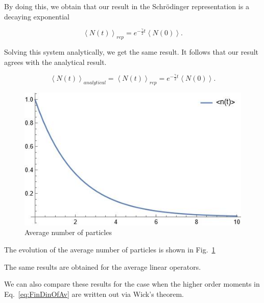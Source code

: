 \documentclass[12pt]{article}
\theoremstyle{definition}
\newcommand\bra{\left<}
\newcommand\ket{\right>}
\newcommand{\braket}[1]{\bra#1\ket}
\def\ga {\gamma}
\begin{document}
	By doing this, we obtain that our result in the Schrödinger representation is a decaying exponential
	
	\begin{equation*}
		\braket{N(t)}_{rep} = e^{-\frac{\ga}{2}t}\braket{N(0)}.
	\end{equation*}
	
	Solving this system analytically, we get the same result. It follows that our result agrees with the analytical result.
	
	\begin{equation*}
		\braket{N(t)}_{analytical } = \braket{N(t)}_{rep} = e^{-\frac{\ga}{2}t}\braket{N(0)}.
	\end{equation*}
	
	\begin{figure}[h!]
		\label{fig:NAv}
		\centering
		\includegraphics[width=0.6\linewidth]{NAnalitical.JPG}
		\caption{Average number of particles}
	\end{figure}
	
	The evolution of the average number of particles is shown in Fig.~\ref{fig:NAv}
	
		The same results are obtained for the average linear operators.
	
	We can also compare these results for the case when the higher order moments in Eq.~\eqref{eq:FinDinOfAv} are written out via Wick's theorem.
	
\end{document}
